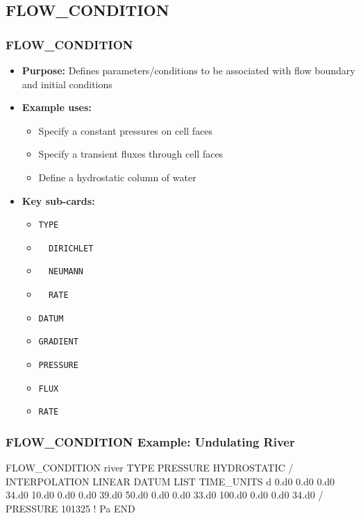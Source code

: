 \subsection{FLOW\_CONDITION}

\begin{frame}\frametitle{FLOW\_CONDITION}

\begin{itemize}
\item[] \textbf{Purpose:} Defines parameters/conditions to be associated with flow boundary and initial conditions
\item[] \textbf{Example uses:}
\begin{itemize}
  \item Specify a constant pressures on cell faces
  \item Specify a transient fluxes through cell faces
  \item Define a hydrostatic column of water
\end{itemize}
\item[] \textbf{Key sub-cards:}
\begin{itemize}
  \item[] \verb|TYPE|
  \item[] \verb|  DIRICHLET|
  \item[] \verb|  NEUMANN|
  \item[] \verb|  RATE|
  \item[] \verb|DATUM|
  \item[] \verb|GRADIENT|
  \item[] \verb|PRESSURE|
  \item[] \verb|FLUX|
  \item[] \verb|RATE|
\end{itemize}
\end{itemize}

\end{frame}

\begin{frame}[fragile]\frametitle{FLOW\_CONDITION Example: Undulating River}

\begin{semiverbatim}
FLOW_CONDITION river
  TYPE
    PRESSURE HYDROSTATIC
  /
  INTERPOLATION LINEAR
  DATUM LIST
    TIME_UNITS d
    0.d0 0.d0 0.d0 34.d0
    10.d0 0.d0 0.d0 39.d0
    50.d0 0.d0 0.d0 33.d0
    100.d0 0.d0 0.d0 34.d0
  /
  PRESSURE 101325 ! Pa
END
\end{semiverbatim}

\end{frame}

